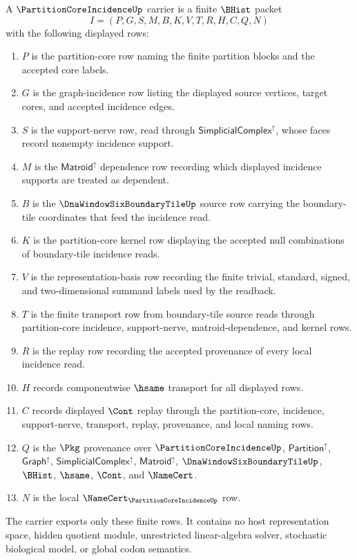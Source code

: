 \begin{definition}
\label{def:partition-core-incidence-carrier}
A $\PartitionCoreIncidenceUp$ carrier is a finite $\BHist$ packet
$$
I=(P,G,S,M,B,K,V,T,R,H,C,Q,N)
$$
with the following displayed rows:
\begin{enumerate}
\item $P$ is the partition-core row naming the finite partition blocks and the accepted core labels.
\item $G$ is the graph-incidence row listing the displayed source vertices, target cores, and accepted incidence edges.
\item $S$ is the support-nerve row, read through $\mathsf{SimplicialComplex}^{\uparrow}$, whose faces record nonempty incidence support.
\item $M$ is the $\mathsf{Matroid}^{\uparrow}$ dependence row recording which displayed incidence supports are treated as dependent.
\item $B$ is the $\DnaWindowSixBoundaryTileUp$ source row carrying the boundary-tile coordinates that feed the incidence read.
\item $K$ is the partition-core kernel row displaying the accepted null combinations of boundary-tile incidence reads.
\item $V$ is the representation-basis row recording the finite trivial, standard, signed, and two-dimensional summand labels used by the readback.
\item $T$ is the finite transport row from boundary-tile source reads through partition-core incidence, support-nerve, matroid-dependence, and kernel rows.
\item $R$ is the replay row recording the accepted provenance of every local incidence read.
\item $H$ records componentwise $\hsame$ transport for all displayed rows.
\item $C$ records displayed $\Cont$ replay through the partition-core, incidence, support-nerve, transport, replay, provenance, and local naming rows.
\item $Q$ is the $\Pkg$ provenance over $\PartitionCoreIncidenceUp$, $\mathsf{Partition}^{\uparrow}$, $\mathsf{Graph}^{\uparrow}$, $\mathsf{SimplicialComplex}^{\uparrow}$, $\mathsf{Matroid}^{\uparrow}$, $\DnaWindowSixBoundaryTileUp$, $\BHist$, $\hsame$, $\Cont$, and $\NameCert$.
\item $N$ is the local $\NameCert_{\PartitionCoreIncidenceUp}$ row.
\end{enumerate}
The carrier exports only these finite rows. It contains no host representation space, hidden quotient module, unrestricted linear-algebra solver, stochastic biological model, or global codon semantics.
\end{definition}

